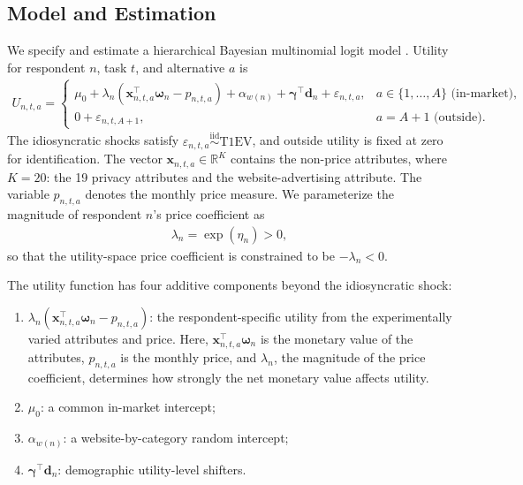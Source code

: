 \documentclass[12pt]{article}
\theoremstyle{definition}
\theoremstyle{remark}
\begin{document}
\begin{appendix}
\subsection{Model and Estimation}

We specify and estimate a hierarchical Bayesian multinomial logit model \citep{rossi2005bayesian}. Utility for respondent $n$, task $t$, and alternative $a$ is
\begin{align*}
  U_{n,t,a}
  =
  \begin{cases}
    \mu_0
    +
    \lambda_n
    \left(
      \bm x_{n,t,a}^{\top}\boldsymbol{\omega}_n
      -
      p_{n,t,a}
    \right)
    +
    \alpha_{w(n)}
    +
    \boldsymbol{\gamma}^{\top}\bm d_n
    +
    \varepsilon_{n,t,a},
    &
    a\in\{1,\ldots,A\}
    \text{ (in-market)},
    \\[0.4em]
    0+\varepsilon_{n,t,A+1},
    &
    a=A+1
    \text{ (outside)}.
  \end{cases}
\end{align*}
The idiosyncratic shocks satisfy
$\varepsilon_{n,t,a}\overset{\mathrm{iid}}{\sim}\mathrm{T1EV}$, and outside utility is fixed at zero for identification. The vector
$\bm x_{n,t,a}\in\mathbb{R}^{K}$ contains the non-price attributes, where $K=20$: the 19 privacy attributes and the website-advertising attribute. The variable $p_{n,t,a}$ denotes the monthly price measure. We parameterize the magnitude of respondent $n$'s price coefficient as
\begin{align*}
    \lambda_n
    =
    \exp(\eta_n)
    >
    0,
\end{align*}
so that the utility-space price coefficient is constrained to be
$-\lambda_n<0$.

The utility function has four additive components beyond the idiosyncratic shock:
\begin{enumerate}[leftmargin=*,nosep]
  \item
  $\lambda_n
  \left(
    \bm x_{n,t,a}^{\top}\boldsymbol{\omega}_n-p_{n,t,a}
  \right)$:
  the respondent-specific utility from the experimentally varied attributes and price. Here, $\bm x_{n,t,a}^{\top}\boldsymbol{\omega}_n$ is the monetary value of the attributes, $p_{n,t,a}$ is the monthly price, and $\lambda_n$, the magnitude of the price coefficient, determines how strongly the net monetary value affects utility.
  \item
  $\mu_0$:
  a common in-market intercept;
  \item
  $\alpha_{w(n)}$:
  a website-by-category random intercept;
  \item
  $\boldsymbol{\gamma}^{\top}\bm d_n$:
  demographic utility-level shifters.
\end{enumerate}


\end{appendix}
\end{document}
